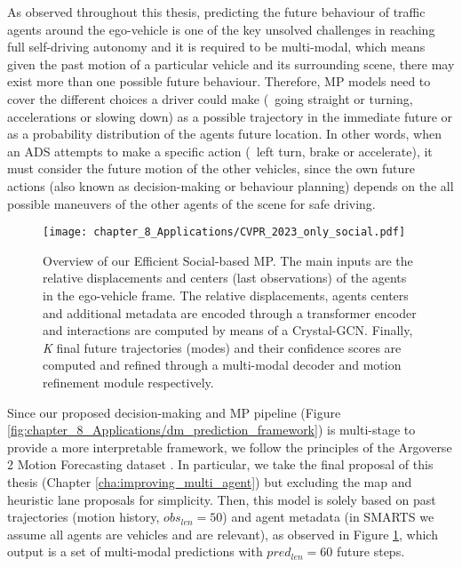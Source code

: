 As observed throughout this thesis, predicting the future behaviour of traffic agents around the ego-vehicle is one of the key unsolved challenges in reaching full self-driving autonomy and it is required to be multi-modal, which means given the past motion of a particular vehicle and its surrounding scene, there may exist more than one possible future behaviour. Therefore, MP models need to cover the different choices a driver could make (\ie \ going straight or turning, accelerations or slowing down) as a possible trajectory in the immediate future or as a probability distribution of the agents future location. In other words, when an \ac{ADS} attempts to make a specific action (\eg \ left turn, brake or accelerate), it must consider the future motion of the other vehicles, since the own future actions (also known as decision-making or behaviour planning) depends on the all possible maneuvers of the other agents of the scene for safe driving. %

\begin{figure}[h]
	\centering
	\setlength{\tabcolsep}{2.0pt}
	\texttt{[image: chapter\_8\_Applications/CVPR\_2023\_only\_social.pdf]}
	\captionsetup{justification=justified}
	\caption[Overview of our Efficient Social-based \ac{MP}]{Overview of our Efficient Social-based \ac{MP}. The main inputs are the relative displacements and centers (last observations) of the agents in the ego-vehicle frame. The relative displacements, agents centers and additional metadata are encoded through a transformer encoder and interactions are computed by means of a Crystal-\ac{GCN}. Finally, \textit{K} final future trajectories (modes) and their confidence scores are computed and refined through a multi-modal decoder and motion refinement module respectively.}
	
	\label{fig:chapter_8_Applications/CVPR_2023_only_social}
\end{figure}

Since our proposed decision-making and \ac{MP} pipeline (Figure \ref{fig:chapter_8_Applications/dm_prediction_framework}) is multi-stage to provide a more interpretable framework, we follow the principles of the Argoverse 2 Motion Forecasting dataset \cite{wilson2023argoverse}. In particular, we take the final proposal of this thesis (Chapter \ref{cha:improving_multi_agent}) but excluding the map and heuristic lane proposals for simplicity. Then, this model is solely based on past trajectories (motion history, $obs_{len} = 50$) and agent metadata (in \ac{SMARTS} we assume all agents are vehicles and are relevant), as observed in Figure \ref{fig:chapter_8_Applications/CVPR_2023_only_social}, which output is a set of multi-modal predictions with $pred_{len} = 60$ future steps.

